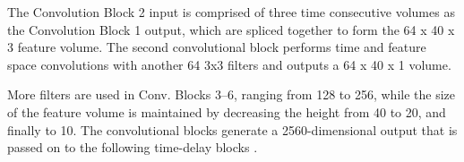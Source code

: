 The Convolution Block 2 input is comprised of three time consecutive volumes as the Convolution Block 1 output, which are spliced together to form the 64 x 40 x 3 feature volume. The second convolutional block performs time and feature space convolutions with another 64 3x3 filters and outputs a 64 x 40 x 1 volume.


More filters are used in Conv. Blocks 3–6, ranging from 128 to 256, while the size of the feature volume is maintained by decreasing the height from 40 to 20, and finally to 10. The convolutional blocks generate a 2560-dimensional output that is passed on to the following time-delay blocks \cite{georgescu_performance_2021}.

